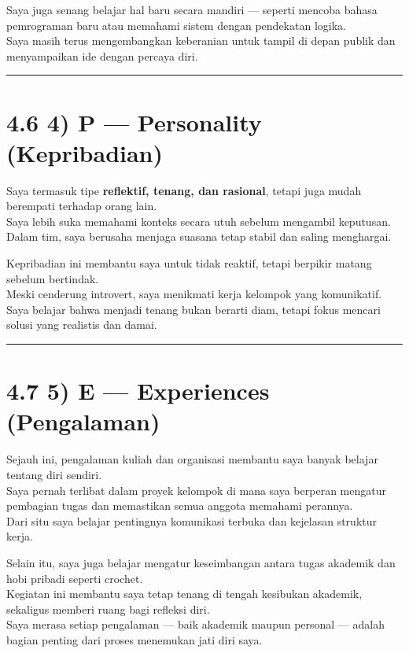 \documentclass[
  letterpaper,
  DIV=11,
  numbers=noendperiod]{scrreprt}
\begin{document}
Saya juga senang belajar hal baru secara mandiri --- seperti mencoba
bahasa pemrograman baru atau memahami sistem dengan pendekatan logika.\\
Saya masih terus mengembangkan keberanian untuk tampil di depan publik
dan menyampaikan ide dengan percaya diri.

\begin{center}\rule{0.5\linewidth}{0.5pt}\end{center}

\section{4.6 4) P --- Personality
(Kepribadian)}\label{p-personality-kepribadian}

Saya termasuk tipe \textbf{reflektif, tenang, dan rasional}, tetapi juga
mudah berempati terhadap orang lain.\\
Saya lebih suka memahami konteks secara utuh sebelum mengambil
keputusan.\\
Dalam tim, saya berusaha menjaga suasana tetap stabil dan saling
menghargai.

Kepribadian ini membantu saya untuk tidak reaktif, tetapi berpikir
matang sebelum bertindak.\\
Meski cenderung introvert, saya menikmati kerja kelompok yang
komunikatif.\\
Saya belajar bahwa menjadi tenang bukan berarti diam, tetapi fokus
mencari solusi yang realistis dan damai.

\begin{center}\rule{0.5\linewidth}{0.5pt}\end{center}

\section{4.7 5) E --- Experiences
(Pengalaman)}\label{e-experiences-pengalaman}

Sejauh ini, pengalaman kuliah dan organisasi membantu saya banyak
belajar tentang diri sendiri.\\
Saya pernah terlibat dalam proyek kelompok di mana saya berperan
mengatur pembagian tugas dan memastikan semua anggota memahami
perannya.\\
Dari situ saya belajar pentingnya komunikasi terbuka dan kejelasan
struktur kerja.

Selain itu, saya juga belajar mengatur keseimbangan antara tugas
akademik dan hobi pribadi seperti crochet.\\
Kegiatan ini membantu saya tetap tenang di tengah kesibukan akademik,
sekaligus memberi ruang bagi refleksi diri.\\
Saya merasa setiap pengalaman --- baik akademik maupun personal ---
adalah bagian penting dari proses menemukan jati diri saya.
\end{document}
